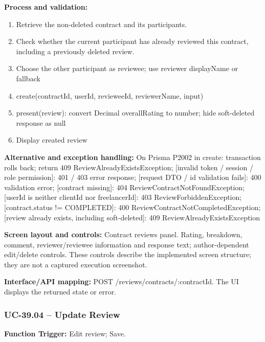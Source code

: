 \textbf{Process and validation:}
\begin{enumerate}
\item Retrieve the non-deleted contract and its participants.
\item Check whether the current participant has already reviewed this contract, including a previously deleted review.
\item Choose the other participant as reviewee; use reviewer display\allowbreak{}Name or fallback
\item create(contract\allowbreak{}Id, user\allowbreak{}Id, reviewee\allowbreak{}Id, reviewer\allowbreak{}Name, input)
\item present(review): convert Decimal overall\allowbreak{}Rating to number; hide soft-deleted response as null
\item Display created review
\end{enumerate}
\textbf{Alternative and exception handling:} On Prisma P2002 in create: transaction rolls back; return 409 Review\allowbreak{}Already\allowbreak{}Exists\allowbreak{}Exception; [invalid token /\allowbreak{} session /\allowbreak{} role permission]: 401 /\allowbreak{} 403 error response; [request DTO /\allowbreak{} id validation fails]: 400 validation error; [contract missing]: 404 Review\allowbreak{}Contract\allowbreak{}Not\allowbreak{}Found\allowbreak{}Exception; [user\allowbreak{}Id is neither client\allowbreak{}Id nor freelancer\allowbreak{}Id]: 403 Review\allowbreak{}Forbidden\allowbreak{}Exception; [contract.status !=\allowbreak{} COMPLETED]: 400 Review\allowbreak{}Contract\allowbreak{}Not\allowbreak{}Completed\allowbreak{}Exception; [review already exists, including soft-deleted]: 409 Review\allowbreak{}Already\allowbreak{}Exists\allowbreak{}Exception

\textbf{Screen layout and controls:} Contract reviews panel. Rating, breakdown, comment, reviewer/\allowbreak{}reviewee information and response text; author-dependent edit/\allowbreak{}delete controls. These controls describe the implemented screen structure; they are not a captured execution screenshot.

\textbf{Interface/\allowbreak{}API mapping:} POST /\allowbreak{}reviews/\allowbreak{}contracts/\allowbreak{}:contract\allowbreak{}Id. The UI displays the returned state or error.

\subsubsection{UC-39.04 -- Update Review}
\textbf{Function Trigger:} Edit review; Save.

